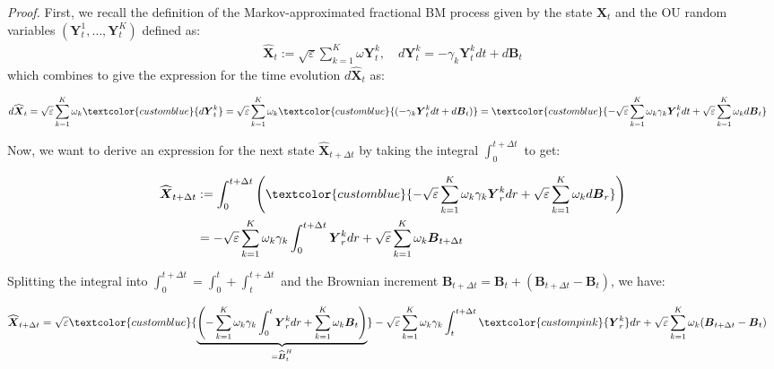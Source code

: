 \documentclass{article}
\newcommand{\bluetext}[1]{\textcolor{customblue}{#1}}
\newcommand{\pinktext}[1]{\textcolor{custompink}{#1}}
\begin{document}
\textit{Proof.} First, we recall the definition of the Markov-approximated fractional BM process given by the state $\boldsymbol{X}_t$ and the OU random variables $(\boldsymbol{Y}_t^1, \dots, \boldsymbol{Y}_t^K)$ defined as:
\begin{align}
    \widehat{\boldsymbol{X}}_t:=\sqrt{\varepsilon}\sum_{k=1}^K\omega\boldsymbol{Y}^k_t, \quad d\boldsymbol{Y}_t^k=-\gamma_k\boldsymbol{Y}_t^kdt+d\boldsymbol{B}_t
\end{align}
which combines to give the expression for the time evolution $d\widehat{\boldsymbol{X}}_t$ as:
\begin{small}
\begin{align}
    d\widehat{\boldsymbol{X}}_t=\sqrt{\varepsilon}\sum_{k=1}^K\omega_k \bluetext{d\boldsymbol{Y}^k_t}&=\sqrt{\varepsilon}\sum_{k=1}^K\omega_k \bluetext{(-\gamma_k\boldsymbol{Y}_t^kdt+d\boldsymbol{B}_t)}=\bluetext{-\sqrt{\varepsilon}\sum_{k=1}^K\omega_k \gamma_k\boldsymbol{Y}_t^kdt +\sqrt{\varepsilon}\sum_{k=1}^K\omega_kd\boldsymbol{B}_t}
\end{align}
\end{small}
Now, we want to derive an expression for the next state $\widehat{\boldsymbol{X}}_{t+\Delta t}$ by taking the integral $\int_{0}^{t+\Delta t}$ to get:
\begin{small}
\begin{align}
    \widehat{\boldsymbol{X}}_{t+\Delta t}&:=\int_0^{t+\Delta t }\left(\bluetext{-\sqrt{\varepsilon}\sum_{k=1}^K\omega_k \gamma_k\boldsymbol{Y}_r^kdr+\sqrt{\varepsilon}\sum_{k=1}^K\omega_kd\boldsymbol{B}_r}\right)\nonumber\\
    &=-\sqrt{\varepsilon}\sum_{k=1}^K\omega_k \gamma_k\int_0^{t+\Delta t }\boldsymbol{Y}_r^kdr +\sqrt{\varepsilon}\sum_{k=1}^K\omega_k\boldsymbol{B}_{t+\Delta t}
\end{align}
\end{small}
Splitting the integral into $\int_0^{t+\Delta t}= \int_0^t+\int_t^{t+\Delta t}$ and the Brownian increment $\boldsymbol{B}_{t+\Delta t}=\boldsymbol{B}_t+(\boldsymbol{B}_{t+\Delta t}-\boldsymbol{B}_t)$, we have:
\begin{small}
\begin{align}
    \widehat{\boldsymbol{X}}_{t+\Delta t}&=\sqrt{\varepsilon}\bluetext{\underbrace{\left(-\sum_{k=1}^K\omega_k \gamma_k\int_0^t\boldsymbol{Y}_r^kdr +\sum_{k=1}^K\omega_k\boldsymbol{B}_t\right)}_{=\widehat{\boldsymbol{B}}_t^H}}-\sqrt{\varepsilon}\sum_{k=1}^K\omega_k \gamma_k\int_t^{t+\Delta t}\pinktext{\boldsymbol{Y}_r^k}dr +\sqrt{\varepsilon}\sum_{k=1}^K\omega_k(\boldsymbol{B}_{t+\Delta t}-\boldsymbol{B}_t)\label{eq:frac-proof-1}
\end{align}
\end{small}
\end{document}
